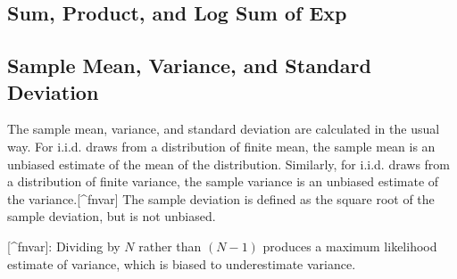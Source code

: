 \begin{description}
{\subsection{Sum, Product, and Log Sum of Exp}


\begin{description}      \end{description}


\subsection{Sample Mean, Variance, and Standard Deviation}


The sample mean, variance, and standard deviation are calculated in the usual way.  For i.i.d. draws from a distribution of finite mean, the sample mean is an unbiased estimate of the mean of the distribution.  Similarly, for i.i.d. draws from a distribution of finite variance, the sample variance is an unbiased estimate of the variance.[^fnvar]  The sample deviation is defined as the square root of the sample deviation, but is not unbiased.

[^fnvar]: Dividing by $N$ rather than $(N-1)$ produces a maximum   likelihood estimate of variance, which is biased to underestimate   variance.


}
\end{description}
